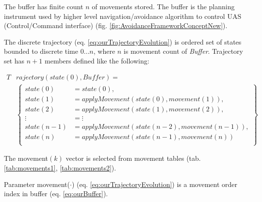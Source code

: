 \begin{note}
  The buffer has finite count $n$ of movements stored. The buffer is the planning instrument used by higher level navigation/avoidance algorithm to control UAS (Control/Command interface) (fig. \ref{fig:AvoidanceFrameworkConceptNew}).
\end{note}


The discrete trajectory (eq. \ref{eq:ourTrajectoryEvolution}) is ordered set of states bounded to discrete time $0\dots n$, where $n$ is movement count of \emph{Buffer}. Trajectory set has $n+1$ members defined like the following:

\begin{equation}\label{eq:ourTrajectoryEvolution}
    \begin{aligned}
    T&rajectory(state(0),Buffer)=\\
        &\left\{
        \begin{aligned}
            state(0) &= state(0),\\
            state(1) &= apply Movement\left(state(0), movement(1)\right),  \\
            state(2) &= apply Movement\left(state(1), movement(2)\right),  \\
             \vdots  &= \vdots\\
            state(n-1) &= apply Movement\left(state(n-2), movement(n-1)\right),  \\
            state(n)   &= apply Movement\left(state(n-1), movement(n)\right)  \\
        \end{aligned}
        \right\}
    \end{aligned}
\end{equation}

\noindent The movement$(k)$ vector is selected from movement tables (tab. \ref{tab:movements1}, \ref{tab:movements2}).

\begin{note}
	Parameter movement($\cdot$) (eq. \ref{eq:ourTrajectoryEvolution}) is a movement order index in buffer (eq. \ref{eq:ourBuffer}).
\end{note}